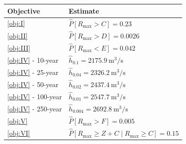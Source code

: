\begin{tabularx}{\linewidth}{l>{\centering\arraybackslash}X}
\toprule  Objective & Estimate\\\midrule
  \ref{obj:I} & $\hat{P}[R_{\max} > C] = 0.23$\\\addlinespace
  \ref{obj:II} & $\hat{P}[R_{\max} > D] = 0.0026$\\\addlinespace
  \ref{obj:III} & $\hat{P}[R_{\max} < E] = 0.042$\\\addlinespace
  \ref{obj:IV} - 10-year & $\hat{h}_{0.1} = \qty{2175.9}{\metre\cubed\per\second}$\\\addlinespace
  \ref{obj:IV} - 25-year & $\hat{h}_{0.04} = \qty{2326.2}{\metre\cubed\per\second}$\\\addlinespace
  \ref{obj:IV} - 50-year & $\hat{h}_{0.02} = \qty{2437.4}{\metre\cubed\per\second}$\\\addlinespace
  \ref{obj:IV} - 100-year & $\hat{h}_{0.01} = \qty{2547.7}{\metre\cubed\per\second}$\\\addlinespace
  \ref{obj:IV} - 250-year & $\hat{h}_{0.004} = \qty{2692.8}{\metre\cubed\per\second}$\\\addlinespace
  \ref{obj:V} & $\hat{P}[R_{\max} > F] = 0.005$\\\addlinespace
  \ref{obj:VI} & $\hat{P}[R_{\max} \ge Z + C \mid R_{\max} \ge C] = 0.15$\\\bottomrule
\end{tabularx}